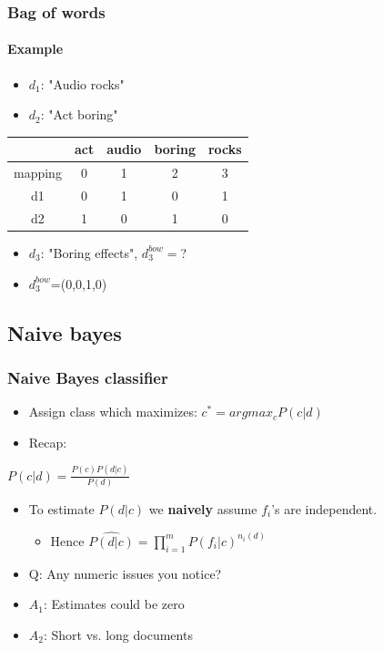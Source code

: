 \documentclass{beamer}
\begin{document}
\begin{frame}
	\frametitle{Bag of words}
	\framesubtitle{Example}
	\begin{itemize}
		\item $d_1$: "Audio rocks"
		\item $d_2$: "Act boring"
	\end{itemize}
	\pause
	\begin{center}
	\begin{table}
		\begin{tabular}{c|c|c|c|c}
			& act & audio & boring & rocks \\ \hline \hline
			mapping & 0 & 1 & 2 & 3 \\ \hline
			d1 & 0 & 1 & 0 & 1 \\
			d2 & 1 & 0 & 1 & 0
		\end{tabular}
	\end{table}
	\end{center}
	
	\pause
	\begin{itemize}
		\item $d_3$: "Boring effects", $d_3^{bow}=$? \pause
		\item $d_3^{bow}$=(0,0,1,0)
	\end{itemize}
\end{frame}

\subsection{Naive bayes}
\begin{frame}
	\frametitle{Naive Bayes classifier}
	\begin{itemize}
		\item Assign class which maximizes: $c^{*}=argmax_{c} P(c|d)$
		\pause
		\item Recap:
	\end{itemize}
	
	\begin{Definition}
		\center
		$P(c|d) = \frac{P(c)P(d|c)}{P(d)}$
	\end{Definition}
	\pause
	\begin{itemize}
		\item To estimate $P(d|c)$ we \textbf{naively} assume $f_i$'s are independent.
		\pause
		\begin{itemize}
			\item Hence $\widehat{P(d|c)}=\prod_{i=1}^{m}P(f_i|c)^{n_i(d)}$ 
		\end{itemize}
		\pause
		\item Q: Any numeric issues you notice?
		\pause
		\item $A_1$: Estimates could be zero
		\pause
		\item $A_2$: Short vs. long documents
	\end{itemize}
\end{frame}
\end{document}
